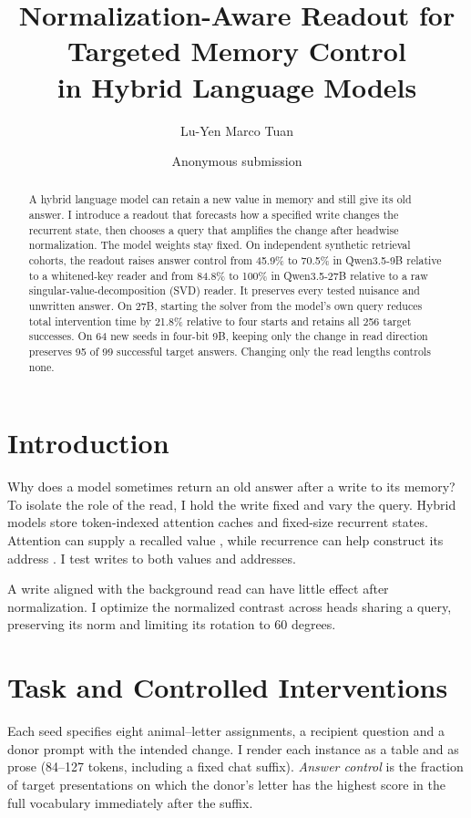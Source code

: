 \documentclass[letterpaper]{article}
\title{Normalization-Aware Readout for Targeted Memory Control\\in Hybrid Language Models}
\author{Lu-Yen Marco Tuan}
\author{Anonymous submission}
\begin{document}
\maketitle


\begin{abstract}
A hybrid language model can retain a new value in memory and still
give its old answer. I introduce a readout that forecasts how a specified
write changes the recurrent state, then chooses a query that amplifies
the change after headwise normalization. The model weights stay fixed.
On independent synthetic retrieval cohorts, the readout raises answer
control from 45.9\% to 70.5\% in Qwen3.5-9B relative to a whitened-key
reader and from 84.8\% to 100\% in Qwen3.5-27B relative to a raw
singular-value-decomposition (SVD) reader. It preserves every tested
nuisance and unwritten answer. On 27B, starting the solver from the
model's own query reduces total intervention time by 21.8\% relative
to four starts and retains all 256 target successes. On 64 new seeds in four-bit 9B, keeping only the change in read direction preserves 95 of 99 successful target answers. Changing only the read lengths controls none.
\end{abstract}

\section{Introduction}
Why does a model sometimes return an old answer after a write to its
memory? To isolate the role of the read, I hold the write fixed and vary the query.
Hybrid models store token-indexed attention caches and fixed-size
recurrent states. Attention can supply a recalled value \citep{lee2026},
while recurrence can help construct its address \citep{zeng2026}.
I test writes to both values and addresses.

A write aligned with the background read can have little effect after
normalization. I optimize the normalized contrast across heads sharing
a query, preserving its norm and limiting its rotation to $60$ degrees.

\section{Task and Controlled Interventions}
Each seed specifies eight animal--letter assignments, a recipient question
and a donor prompt with the intended change. I render each instance as
a table and as prose (84--127 tokens, including a fixed chat suffix).
\emph{Answer control} is the fraction of target presentations on which
the donor's letter has the highest score in the full vocabulary
immediately after the suffix.
\end{document}
